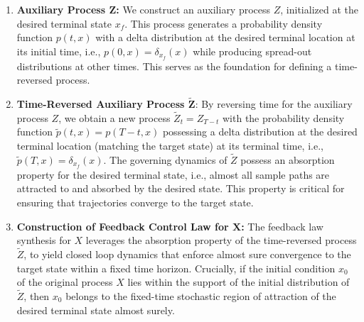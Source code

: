 \documentclass[letterpaper, 10 pt, conference]{ieeeconf}  %
\begin{document}

\begin{enumerate}
    \item \textbf{Auxiliary Process $\boldsymbol{Z}$:} We construct an auxiliary process $Z$, initialized at the desired terminal state $x_f$. This process generates a probability density function $p(t,x)$ with a delta distribution at the desired terminal location at its initial time, i.e., $p(0,x) = \delta_{x_f}(x)$ while producing spread-out distributions at other times. This serves as the foundation for defining a time-reversed process.

    \item \textbf{Time-Reversed Auxiliary Process $\boldsymbol{\tilde{Z}}$}: By reversing time for the auxiliary process $Z$, we obtain a new process $\tilde{Z}_t =Z_{T-t}$ with the probability density function $\tilde{p}(t,x) = p(T-t,x)$ possessing a delta distribution at the desired terminal location (matching the target state) at its terminal time, i.e., $\tilde{p}(T,x) = \delta_{x_f}(x)$. The governing dynamics of $\tilde{Z}$ possess an absorption property for the desired terminal state, i.e., almost all sample paths are attracted to and absorbed by the desired state. This property is critical for ensuring that trajectories converge to the target state.

    \item \textbf{Construction of Feedback Control Law for $\boldsymbol{X}$:} The feedback law synthesis for $X$ leverages the absorption property of the time-reversed process $\tilde{Z}$, to yield closed loop dynamics that enforce almost sure convergence to the target state within a fixed time horizon. Crucially, if the initial condition $x_0$ of the original process $X$ lies within the support of the initial distribution of $\tilde{Z}$, then $x_0$ belongs to the fixed-time stochastic region of attraction of the desired terminal state almost surely.
\end{enumerate}
\end{document}
